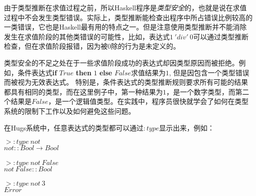 由于类型推断在求值过程之前，所以Haskell程序是\textit{类型安全}的，也就是说在求值过程中不会发生类型错误。实际上，类型推断能检查出程序中所占错误比例较高的一类错误，它也是Haskell最有用的特点之一。但是注意使用类型推断并不能消除发生在求值阶段的其他类错误的可能性，比如，表达式$1~'div'~0$可以通过类型推断检查，但在求值阶段报错，因为被$0$除的行为是未定义的。

类型安全的不足之处在于一些求值阶段成功的表达式却因类型原因而被拒绝。例如，条件表达式\textbf{if} 
$True$ \textbf{then} $1$ \textbf{else} $False$求值结果为$1$,
但是因包含一个类型错误而被视为无效表达式。
特别是，条件表达式的类型推断规则要求所有可能的结果都具有相同的类型，而在这里例子中，第一种结果为$1$，是一个数字类型，而第二个结果是$False$，是一个逻辑值类型。在实践中，程序员很快就学会了如何在类型系统的限制下工作以及如何避免这些问题。

在Hugs系统中，任意表达式的类型都可以通过$:type$显示出来，例如：

\noindent\hspace*{1cm} $> :type~not$\\
\hspace*{1cm} $not :: Bool \rightarrow Bool$\\
\hspace*{1cm} \\
\hspace*{1cm} $> :type~not~False$\\
\hspace*{1cm} $not~False :: Bool$\\
\hspace*{1cm} \\ 
\hspace*{1cm} $> :type~not~3$\\
\hspace*{1cm} $Error$

